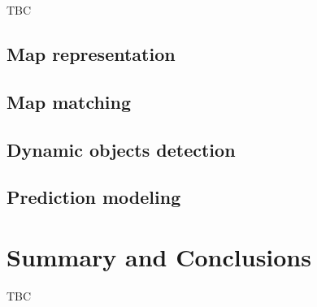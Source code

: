 TBC

\subsection{Map representation}
\subsection{Map matching}
\subsection{Dynamic objects detection}
\subsection{Prediction modeling}

\section{Summary and Conclusions}\label{sec:literature:conclusions}

TBC
